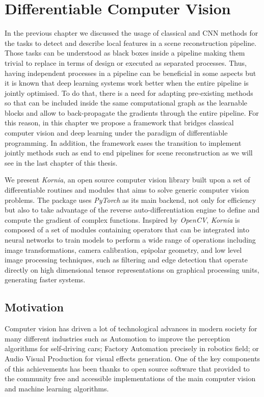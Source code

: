 \chapter{Differentiable Computer Vision}
\label{chap:chap_03}

\newcommand{\lib}{\textit{Kornia}}

In the previous chapter we discussed the usage of classical and CNN methods for the tasks to detect and describe local features in a scene reconstruction pipeline. Those tasks can be understood as black boxes inside a pipeline making them trivial to replace in terms of design or executed as separated processes. Thus, having independent processes in a pipeline can be beneficial in some aspects but it is known that deep learning systems work better when the entire pipeline is jointly optimised. To do that, there is a need for adapting pre-existing methods so that can be included inside the same computational graph as the learnable blocks and allow to back-propagate the gradients through the entire pipeline. For this reason, in this chapter we propose a framework that bridges classical computer vision and deep learning under the paradigm of differentiable programming. In addition, the framework eases the transition to implement jointly methods such as end to end pipelines for scene reconstruction as we will see in the last chapter of this thesis.

We present \lib{}, an open source computer vision library built upon a set of differentiable routines and modules that aims to solve generic computer vision problems. The package uses \textit{PyTorch} as its main backend, not only for efficiency but also to take advantage of the reverse auto-differentiation engine to define and compute the gradient of complex functions. Inspired by \textit{OpenCV}, \lib{} is composed of a set of modules containing operators that can be integrated into neural networks to train models to perform a wide range of operations including image transformations, camera calibration, epipolar geometry, and low level image processing techniques, such as filtering and edge detection that operate directly on high dimensional tensor representations on graphical processing units, generating faster systems.

\newpage
\section{Motivation}

Computer vision has driven a lot of technological advances in modern society for many different industries such as Automotion to improve the perception algorithms for self-driving cars; Factory Automation precisely in robotics field; or Audio Visual Production for visual effects generation. One of the key components of this achievements has been thanks to open source software that provided to the community free and accessible implementations of the main computer vision and machine learning algorithms.

